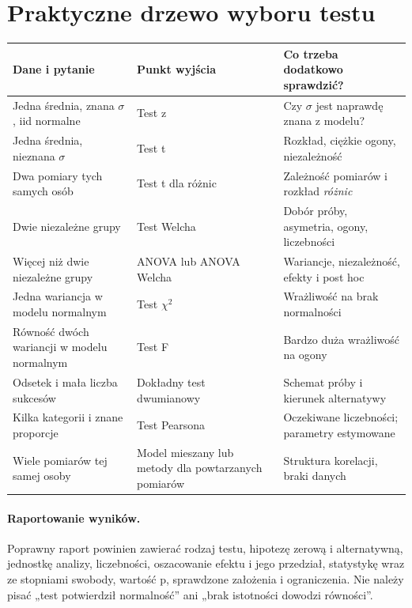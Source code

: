 \documentclass[11pt,a4paper,oneside]{report}
\numberwithin{equation}{chapter}
\theoremstyle{plain}
\theoremstyle{definition}
\theoremstyle{remark}
\begin{document}
\section{Praktyczne drzewo wyboru testu}
\begin{center}\small
\begin{tabular}{>{\raggedright\arraybackslash}p{}>{\raggedright\arraybackslash}p{}>{\raggedright\arraybackslash}p{}}
\toprule
\textbf{Dane i pytanie} & \textbf{Punkt wyjścia} & \textbf{Co trzeba dodatkowo sprawdzić?}\\
\midrule
Jedna średnia, znana $\sigma$, iid normalne & Test z & Czy $\sigma$ jest naprawdę znana z modelu?\\
Jedna średnia, nieznana $\sigma$ & Test t & Rozkład, ciężkie ogony, niezależność\\
Dwa pomiary tych samych osób & Test t dla różnic & Zależność pomiarów i rozkład \emph{różnic}\\
Dwie niezależne grupy & Test Welcha & Dobór próby, asymetria, ogony, liczebności\\
Więcej niż dwie niezależne grupy & ANOVA lub ANOVA Welcha & Wariancje, niezależność, efekty i post hoc\\
Jedna wariancja w modelu normalnym & Test $\chi^2$ & Wrażliwość na brak normalności\\
Równość dwóch wariancji w modelu normalnym & Test F & Bardzo duża wrażliwość na ogony\\
Odsetek i mała liczba sukcesów & Dokładny test dwumianowy & Schemat próby i kierunek alternatywy\\
Kilka kategorii i znane proporcje & Test Pearsona & Oczekiwane liczebności; parametry estymowane\\
Wiele pomiarów tej samej osoby & Model mieszany lub metody dla powtarzanych pomiarów & Struktura korelacji, braki danych\\
\bottomrule
\end{tabular}
\end{center}

\paragraph{Raportowanie wyników.}
Poprawny raport powinien zawierać rodzaj testu, hipotezę
zerową i alternatywną, jednostkę analizy, liczebności,
oszacowanie efektu i jego przedział, statystykę wraz ze
stopniami swobody, wartość p, sprawdzone założenia i
ograniczenia. Nie należy pisać „test potwierdził normalność”
ani „brak istotności dowodzi równości”.
\end{document}
